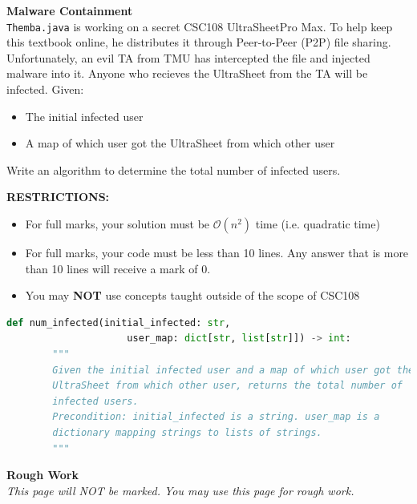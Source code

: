 \documentclass[letterpaper,12pt,addpoints]{exam}
\begin{document}
\begin{questions}
    \clearpage
    \question[10] \textbf{Malware Containment} \\
    \texttt{Themba.java} is working on a secret CSC108 UltraSheet\texttrademark  Pro Max. To help keep this textbook online, he distributes it through Peer-to-Peer (P2P) file sharing. Unfortunately, an evil TA from TMU has intercepted the file and injected malware into it. Anyone who recieves the UltraSheet from the TA will be infected. Given: 
    \begin{itemize}
        \item The initial infected user
        \item A map of which user got the UltraSheet from which other user
    \end{itemize}
    Write an algorithm to determine the total number of infected users.
    \begin{center}
        \textbf{RESTRICTIONS:}
        \begin{itemize}
            \item For full marks, your solution must be $\mathcal{O}(n^2)$ time (i.e. quadratic time)
            \item For full marks, your code must be less than 10 lines. Any answer that is more than 10 lines will receive a mark of 0.
            \item You may \textbf{NOT} use concepts taught outside of the scope of CSC108
        \end{itemize}
    \end{center}
    \begin{lstlisting}[language=Python, style=mystyle]
    def num_infected(initial_infected: str, 
                     user_map: dict[str, list[str]]) -> int:
        """
        Given the initial infected user and a map of which user got the 
        UltraSheet from which other user, returns the total number of 
        infected users.
        Precondition: initial_infected is a string. user_map is a 
        dictionary mapping strings to lists of strings.
        """
\end{lstlisting}


    \end{questions}

    \clearpage
    \begin{center}
        \textbf{Rough Work}\\
        \textit{This page will NOT be marked. You may use this page for rough work.}
    \end{center}
\end{document}

